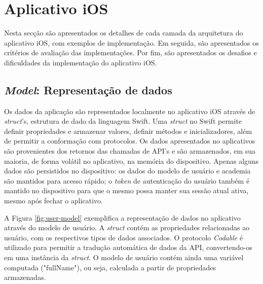\section{Aplicativo iOS}
Nesta secção são apresentados os detalhes de cada camada da arquitetura do aplicativo iOS, com exemplos de implementação. Em seguida, são apresentados os critérios de avaliação das implementações. Por fim, são apresentados os desafios e dificuldades da implementação do aplicativo iOS.

\subsection{\textit{Model}: Representação de dados}
Os dados da aplicação são representados localmente no aplicativo iOS através de \textit{struct}'s, estrutura de dado da linguagem Swift. Uma \textit{struct} no Swift permite definir propriedades e armazenar valores, definir métodos e inicializadores, além de permitir a conformação com protocolos. Os dados apresentados no aplicativos são provenientes dos retornos das chamadas de API's e são armazenados, em sua maioria, de forma volátil no aplicativo, na memória do dispositivo. Apenas alguns dados são persistidos no dispositivo: os dados do modelo de usuário e academia são mantidos para acesso rápido; o \textit{token} de autenticação do usuário também é mantido no dispositivo para que o mesmo possa manter sua sessão atual ativa, mesmo após fechar o aplicativo.


A Figura \ref{fig:user-model} exemplifica a representação de dados no aplicativo através do modelo de usuário. A \textit{struct} contém as propriedades relacionadas ao usuário, com os respectivos tipos de dados associados. O protocolo \textit{Codable} é utilizado para permitir a tradução automática de dados da API, convertendo-os em uma instância da \textit{struct}. O modelo de usuário contém ainda uma variável computada ("fullName"), ou seja, calculada a partir de propriedades armazenadas.

